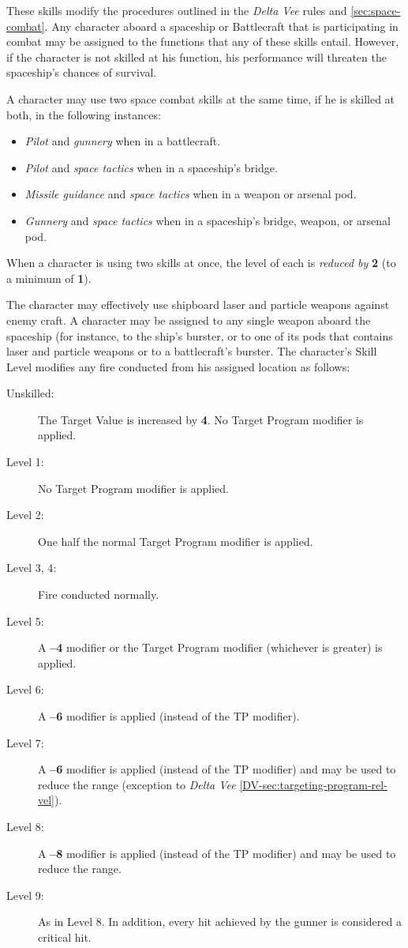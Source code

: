 These skills modify the procedures outlined in the \emph{Delta Vee}
rules and \ref{sec:space-combat}.  Any character aboard a spaceship or
Battlecraft that is participating in combat may be assigned to the
functions that any of these skills entail.  However, if the character
is not skilled at his function, his performance will threaten the
spaceship's chances of survival.

A character may use two space combat skills at the same time, if he is
skilled at both, in the following instances:

\begin{itemize}
\item \emph{Pilot} and \emph{gunnery} when in a battlecraft.    
\item \emph{Pilot} and \emph{space tactics} when in a spaceship's bridge.    
\item \emph{Missile guidance} and \emph{space tactics} when in a
  weapon or arsenal pod.
\item \emph{Gunnery} and \emph{space tactics} when in a spaceship's
  bridge, weapon, or arsenal pod.
\end{itemize}

When a character is using two skills at once, the level of each is
\emph{reduced by} \textbf{2} (to a minimum of \textbf{1}).

\label{sec:skill-gunnery}

The character may effectively use shipboard laser and particle weapons
against enemy craft.  A character may be assigned to any single weapon
aboard the spaceship (for instance, to the ship's burster, or to one
of its pods that contains laser and particle weapons or to a
battlecraft's burster.  The character's Skill Level modifies any fire
conducted from his assigned location as follows:

\begin{description}
\item[Unskilled:] The Target Value is increased by \textbf{4}.  No
  Target Program modifier is applied.
\item[Level 1:] No Target Program modifier is applied.
\item[Level 2:] One half the normal Target Program modifier is
  applied.
\item[Level 3, 4:] Fire conducted normally.
\item[Level 5:] A \textbf{--4} modifier or the Target Program
  modifier (whichever is greater) is applied.
\item[Level 6:] A \textbf{--6} modifier is applied (instead of the TP
  modifier).
\item[Level 7:] A \textbf{--6} modifier is applied (instead of the TP
  modifier) and may be used to reduce the range (exception to
  \emph{Delta Vee} \ref{DV-sec:targeting-program-rel-vel}). 
\item[Level 8:] A \textbf{--8} modifier is applied (instead of the TP
  modifier) and may be used to reduce the range.
\item[Level 9:] As in Level 8.  In addition, every hit achieved by the
  gunner is considered a critical hit.
\end{description}

